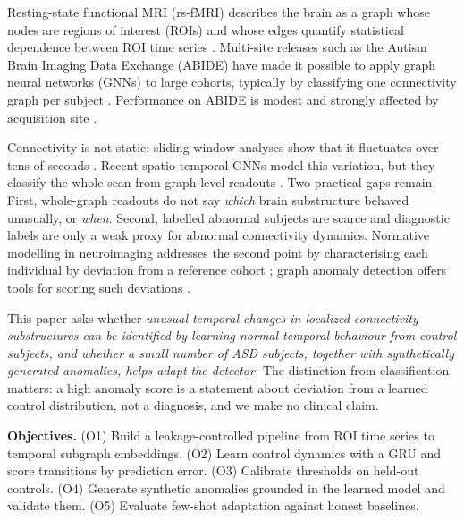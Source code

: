 \documentclass[conference]{IEEEtran}
\makeatletter
\renewcommand\section{\@startsection{section}{1}{\z@}{1.5ex plus 1.5ex minus 0.5ex}{0.7ex}{\normalfont\centering\bfseries}}
\makeatother
\begin{document}
\section{INTRODUCTION}
Resting-state functional MRI (rs-fMRI) describes the brain as a graph whose nodes are regions of interest (ROIs) and whose edges quantify statistical dependence between ROI time series \cite{bullmore2009,smith2011}. Multi-site releases such as the Autism Brain Imaging Data Exchange (ABIDE) \cite{dimartino2014} have made it possible to apply graph neural networks (GNNs) to large cohorts, typically by classifying one connectivity graph per subject \cite{parisot2018,li2021braingnn,kan2022,cui2023}. Performance on ABIDE is modest and strongly affected by acquisition site \cite{abraham2017,heinsfeld2018,yu2018harm}.

Connectivity is not static: sliding-window analyses show that it fluctuates over tens of seconds \cite{hutchison2013,allen2014,preti2017}. Recent spatio-temporal GNNs model this variation, but they classify the whole scan from graph-level readouts \cite{kim2021,gadgil2020}. Two practical gaps remain. First, whole-graph readouts do not say \emph{which} brain substructure behaved unusually, or \emph{when}. Second, labelled abnormal subjects are scarce and diagnostic labels are only a weak proxy for abnormal connectivity dynamics. Normative modelling in neuroimaging addresses the second point by characterising each individual by deviation from a reference cohort \cite{marquand2016}; graph anomaly detection offers tools for scoring such deviations \cite{ma2023survey}.

This paper asks whether \emph{unusual temporal changes in localized connectivity substructures can be identified by learning normal temporal behaviour from control subjects, and whether a small number of ASD subjects, together with synthetically generated anomalies, helps adapt the detector.} The distinction from classification matters: a high anomaly score is a statement about deviation from a learned control distribution, not a diagnosis, and we make no clinical claim.

\textbf{Objectives.} (O1) Build a leakage-controlled pipeline from ROI time series to temporal subgraph embeddings. (O2) Learn control dynamics with a GRU and score transitions by prediction error. (O3) Calibrate thresholds on held-out controls. (O4) Generate synthetic anomalies grounded in the learned model and validate them. (O5) Evaluate few-shot adaptation against honest baselines.
\end{document}
